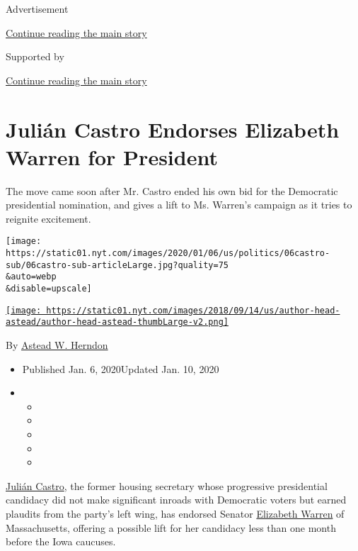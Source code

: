 Advertisement

\protect\hyperlink{after-top}{Continue reading the main story}

Supported by

\protect\hyperlink{after-sponsor}{Continue reading the main story}

\hypertarget{juliuxe1n-castro-endorses-elizabeth-warren-for-president}{%
\section{Julián Castro Endorses Elizabeth Warren for
President}\label{juliuxe1n-castro-endorses-elizabeth-warren-for-president}}

The move came soon after Mr. Castro ended his own bid for the Democratic
presidential nomination, and gives a lift to Ms. Warren's campaign as it
tries to reignite excitement.

\texttt{[image: https://static01.nyt.com/images/2020/01/06/us/politics/06castro-sub/06castro-sub-articleLarge.jpg?quality=75\\\&auto=webp\\\&disable=upscale]}

\href{https://www.nytimes.com/by/astead-w-herndon}{\texttt{[image: https://static01.nyt.com/images/2018/09/14/us/author-head-astead/author-head-astead-thumbLarge-v2.png]}}

By \href{https://www.nytimes.com/by/astead-w-herndon}{Astead W. Herndon}

\begin{itemize}
\item
  Published Jan. 6, 2020Updated Jan. 10, 2020
\item
  \begin{itemize}
  \item
  \item
  \item
  \item
  \item
  \end{itemize}
\end{itemize}

\href{https://www.nytimes.com/2020/01/02/us/politics/julian-castro-dropping-out.html}{Julián
Castro}, the former housing secretary whose progressive presidential
candidacy did not make significant inroads with Democratic voters but
earned plaudits from the party's left wing, has endorsed Senator
\href{https://www.nytimes.com/2020/01/08/us/politics/elizabeth-warren-campaign.html}{Elizabeth
Warren} of Massachusetts, offering a possible lift for her candidacy
less than one month before the Iowa caucuses.

